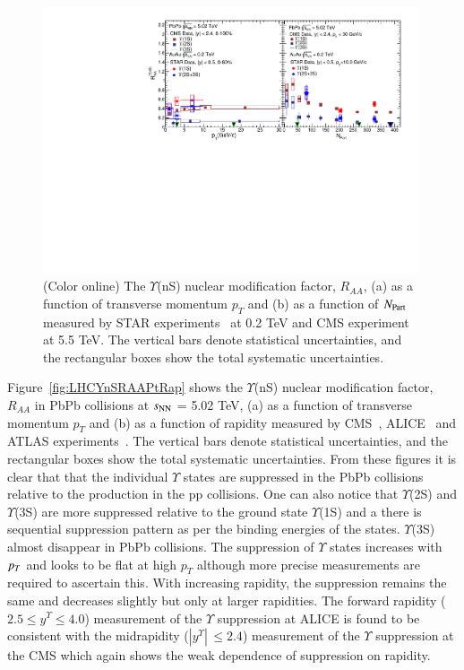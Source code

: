 \begin{figure}
  \includegraphics[width=0.99\textwidth]{Figures/ExpOverview/Fig_RHIC_LHC_YnSRAA.pdf}
  \caption{(Color online) The $\Upsilon$(nS) nuclear modification factor, $R_{AA}$, (a) as a function of transverse momentum $p_{T}$
    and (b) as a function of $N_{\rm Part}$ measured by STAR experiments~\cite{Wang:2019vau} at 0.2 TeV and CMS experiment~\cite{CMS:2018zza} at 5.5 TeV.
    The vertical bars denote statistical uncertainties, and the rectangular boxes show the total systematic uncertainties.
  }
  \label{fig:RHICYnSRAANPart}
\end{figure}


Figure~\ref{fig:LHCYnSRAAPtRap} shows the $\Upsilon$(nS) nuclear modification factor, $R_{AA}$
in PbPb collisions at $s_{\rm NN}$ = 5.02 TeV, (a) as a function of transverse momentum $p_{T}$
and (b) as a function of rapidity measured by CMS~\cite{CMS:2018zza}, ALICE~\cite{ALICE:2020wwx}
and ATLAS experiments~\cite{ALICE:2020wwx}.
 The vertical bars denote statistical uncertainties, and the rectangular boxes
show the total systematic uncertainties. From these figures it is clear that 
that the individual $\Upsilon$ states are suppressed in
the PbPb collisions relative to the production in the pp collisions.
One can also notice that $\Upsilon$(2S) and $\Upsilon$(3S) are 
more suppressed relative to the ground state $\Upsilon$(1S) and a there is sequential
suppression pattern as per the binding energies of the states.
$\Upsilon$(3S) almost disappear in PbPb collisions. 
  The suppression of $\Upsilon$ states increases with $p_{T}$ and looks to be flat at high $p_T$
although more precise measurements are required to ascertain this. 
With increasing rapidity, the suppression remains the same and decreases
slightly but only at larger rapidities.
The forward rapidity ($2.5 \leq y^{\Upsilon} \leq 4.0$) measurement of the $\Upsilon$ suppression at 
ALICE is found to be consistent with the midrapidity ($|y^{\Upsilon}|\,\leq 2.4$)
measurement of the $\Upsilon$ suppression at the CMS which again shows the weak dependence
of suppression on rapidity.



